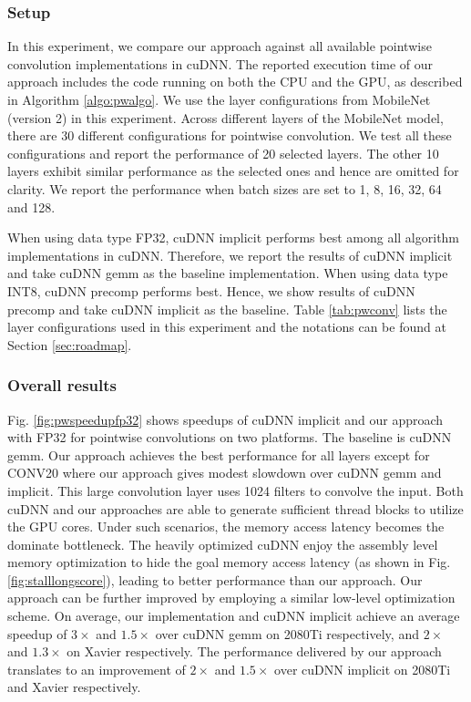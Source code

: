 %	


\subsubsection{Setup} In this experiment, we compare our approach against all available pointwise convolution implementations in cuDNN.
The reported execution time of our approach includes the code running on both the CPU and the GPU, as described in Algorithm
\ref{algo:pwalgo}. We use the layer configurations from MobileNet (version 2) in this experiment. Across different layers of the MobileNet
model, there are 30 different configurations for pointwise convolution. We test all these configurations and report the performance of 20
selected layers. The other 10 layers exhibit similar performance as the selected ones and hence are omitted for clarity. We report the
performance when batch sizes are set to 1, 8, 16, 32, 64 and 128.

When using data type FP32, cuDNN implicit performs best among all algorithm implementations in cuDNN. Therefore, we report the results of
cuDNN implicit and take cuDNN gemm as the baseline implementation. When using data type INT8, cuDNN precomp performs best. Hence, we show
results of cuDNN precomp and take cuDNN implicit as the baseline. Table \ref{tab:pwconv} lists the layer configurations used in this
experiment and  the notations can be found at Section \ref{sec:roadmap}.

\subsubsection{Overall results}
  Fig. \ref{fig:pwspeedupfp32} shows speedups of cuDNN implicit and our approach with FP32  for pointwise
convolutions on two platforms. The baseline is cuDNN gemm. Our approach achieves the best performance for all layers except for CONV20
where our approach gives modest slowdown over cuDNN gemm and implicit. This large convolution layer uses 1024 filters to convolve the
input. Both cuDNN and our approaches are able to generate sufficient thread blocks to utilize the GPU cores. Under such scenarios, the
memory access latency becomes the dominate bottleneck. The heavily optimized cuDNN enjoy the assembly level memory optimization to hide the
goal memory access latency (as shown in Fig. \ref{fig:stalllongscore}), leading to better performance than our approach. Our approach can
be further improved by employing a similar low-level optimization scheme. On average, our implementation and cuDNN implicit achieve an
average speedup of $3\times$ and $1.5\times$ over cuDNN gemm on 2080Ti respectively, and $2\times$ and $1.3\times$ on Xavier respectively.
The performance delivered by our approach translates to an improvement of $2\times$ and $1.5\times$ over cuDNN implicit on 2080Ti and
Xavier respectively.

